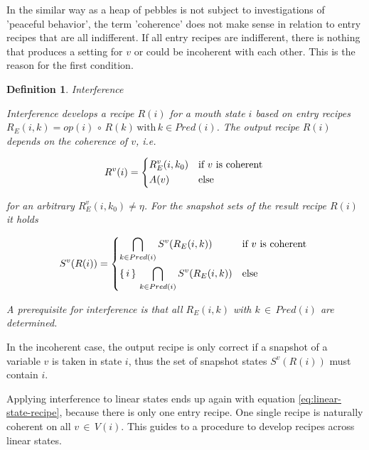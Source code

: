 \documentclass[12pt,a4paper]{scrartcl}
\newtheorem{definition}{Definition}
\begin{document}
In the similar way as a heap of pebbles is not subject to investigations of
'peaceful behavior',  the term 'coherence' does not make sense in relation to 
entry recipes that are all indifferent. If all entry recipes are indifferent,
there is nothing that produces a setting for $v$ or could be incoherent with
each other. This is the reason for the first condition.

\begin{definition} Interference

    Interference develops a recipe $R(i)$ for a mouth state $i$ based on entry
    recipes $R_E(i,k) = op(i)\,\circ\,R(k)\,\mbox{with}\,k \in Pred(i)$.  The
    output recipe $R(i)$ depends on the coherence of $v$, i.e. 

    \begin{equation} \label{eq:interference-output}
        R^v(i) = 
        \begin{dcases*}
            R_E^v(i,k_0) & if $v$ is coherent \\
            A(v)         & else
        \end{dcases*}
    \end{equation}

    for an arbitrary $R_E^v(i,k_0)\neq\eta$.  For the snapshot sets of the result
    recipe $R(i)$ it holds

    \begin{equation} \label{eq:interference-snapshot-sets}
        S^v(R(i)) = 
        \begin{dcases*}
            \bigcap_{k\in Pred(i)} S^v(R_E(i,k))            & if $v$ is coherent \\
            \{\,i\,\}\,\bigcap_{k\in Pred(i)} S^v(R_E(i,k)) & else \\
        \end{dcases*}
    \end{equation}

    A prerequisite for interference is that all $R_E(i,k)$ with $k\,\in\,Pred(i)$
    are determined.

\end{definition}

In the incoherent case, the output recipe is only correct if a snapshot of 
a variable $v$ is taken in state $i$, thus the set of snapshot states
$S^v(R(i))$ must contain $i$.  

Applying interference to linear states ends up again with equation
\eqref{eq:linear-state-recipe}, because there is only one entry recipe.  One
single recipe is naturally coherent on all $v\,\in\,V(i)$. This guides to a
procedure to develop recipes across linear states.
\end{document}
